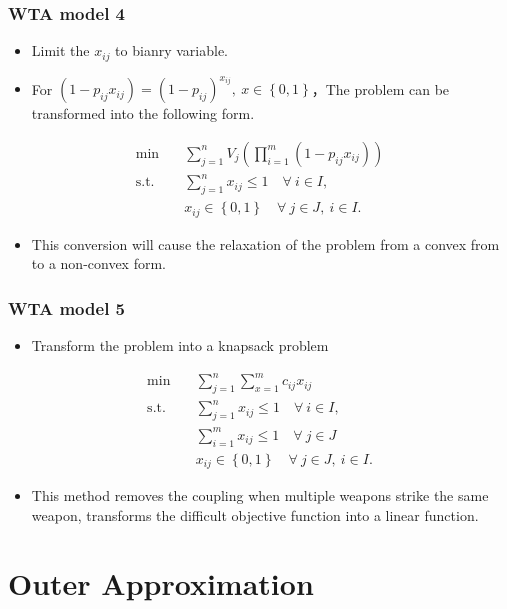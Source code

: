 \documentclass[CJK,10pt]{beamer}
\begin{document}
\begin{frame}
    \frametitle{WTA model 4}
    \begin{itemize}
        \item Limit the $x_{ij}$ to bianry variable.
        \item For $(1-p_{ij}x_{ij}) = (1-p_{ij})^{x_{ij}},~ x \in \left\{ 0,1\right\}$，The problem can be transformed into the following form.
    \end{itemize}
    \begin{align*} \tag{S4}
        \min\quad & \sum_{j=1}^n V_j \left( \prod_{i=1}^m (1 -  p_{ij}x_{ij}) \right) \\ 
        \mathrm{s. t.}\quad &\sum_{j=1}^n x_{ij} \leq 1\quad \forall ~i \in I,\\
        & x_{ij} \in \left\{ 0,1 \right\} \quad \forall~ j\in J , ~ i \in I.
    \end{align*}
    \begin{itemize}
        \item This conversion will cause the relaxation of the problem from a convex from to a non-convex form.
    \end{itemize}
\end{frame}

\begin{frame}
    \frametitle{WTA model 5}
    \begin{itemize}
        \item Transform the problem into a knapsack problem
    \end{itemize}
    \begin{align*} \tag{S5}
        \min\quad & \sum_{j=1}^n{\sum_{x=1}^m{c_{ij}x_{ij}}} \\ 
        \mathrm{s. t.}\quad &\sum_{j=1}^n x_{ij} \leq 1\quad \forall ~i \in I,\\
        & \sum_{i=1}^m x_{ij} \leq 1\quad \forall ~j \in J \\
        & x_{ij} \in \left\{ 0,1 \right\} \quad \forall~ j\in J , ~ i \in I.
    \end{align*}
    \begin{itemize}
        \item This method removes the coupling when multiple weapons strike the same weapon, transforms the difficult objective function into a linear function.
    \end{itemize}
\end{frame}


\section{Outer Approximation}
\end{document}

